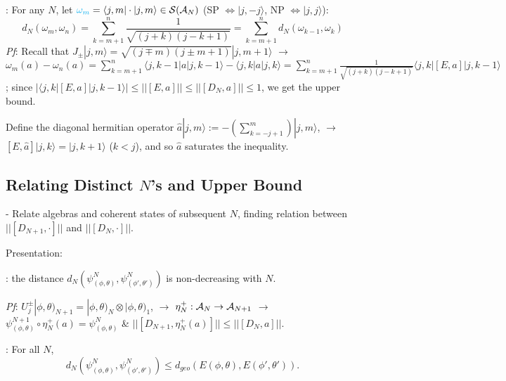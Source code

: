 : For any $N$, let $\textcolor{cyan}{\omega_m} = \langle j, m| \cdot |j, m\rangle \in \mathcal S(\mathcal A_N)$ (SP $\Longleftrightarrow |j, -j\rangle$, NP $\Longleftrightarrow |j, j\rangle$):
\begin{equation}
    d_N(\omega_m, \omega_n) = \sum_{k = m+1}^n \frac{1}{\sqrt{(j+k)(j-k+1)}} = \sum_{k = m+1}^n d_N(\omega_{k-1}, \omega_k)
\end{equation}
\textit{Pf}: Recall that $J_\pm|j,m\rangle = \sqrt{(j\mp m)(j\pm m + 1)}|j, m+1 \rangle$ $\longrightarrow$ $\omega_m(a) - \omega_n(a) = \sum_{k = m+1}^n \langle j, k-1 |a|j, k-1 \rangle - \langle j, k |a| j, k \rangle = \sum_{k = m+1}^n \frac{1}{\sqrt{(j+k)(j-k+1)}} \langle j, k| [E, a] |j, k-1 \rangle$; since $|\langle j, k |[E, a]|j, k-1 \rangle|  \leq ||[E, a]|| \leq ||[D_N, a]|| \leq 1$, we get the upper bound. 

Define the diagonal hermitian operator $\hat a |j, m\rangle := - \left( \sum_{k = -j+1}^m  \right)|j, m\rangle$, $\longrightarrow$ $[E, \hat a] |j, k \rangle = |j, k+1\rangle$ ($k < j$), and so $\hat a$ saturates the inequality.

\linea
\subsection{Relating Distinct $N$'s and Upper Bound}

 - Relate algebras and coherent states of subsequent $N$, finding relation between $||[D_{N+1}, \cdot]||$ and $||[D_N, \cdot]||$.
 
Presentation:

: the distance $d_N(\psi^N_{(\phi, \theta)}, \psi^N_{(\phi', \theta')})$ is non-decreasing with $N$.

\textit{Pf}: $U^\pm_j |\phi, \theta)_{N+1} = |\phi, \theta)_N \otimes |\phi, \theta)_1$, $\xrightarrow{}$ $\eta^+_N: \mathcal A_N \to \mathcal A_{N + 1}$ $\longrightarrow{}$ $\psi^{N+1}_{(\phi, \theta)} \circ \eta^+_N(a) = \psi^N_{(\phi, \theta)}$ \& $||[D_{N + 1}, \eta^+_N(a)]|| \leq ||[D_N, a]||$.

: For all $N$, 
\begin{equation}
    d_N(\psi^N_{(\phi, \theta)}, \psi^N_{(\phi', \theta')}) \leq d_{geo}(E(\phi, \theta), E(\phi', \theta')).
\end{equation}

